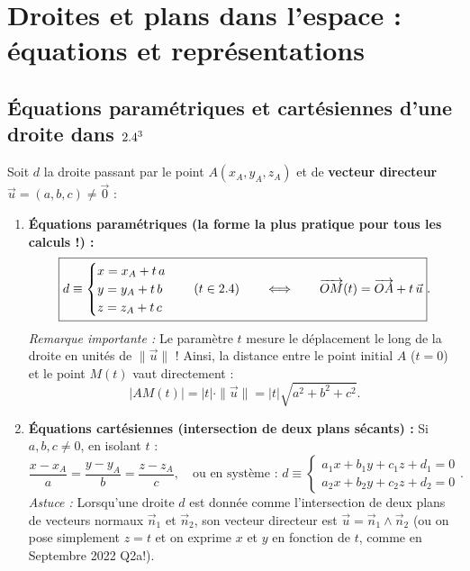 \section{Droites et plans dans l'espace : équations et représentations}

\subsection{Équations paramétriques et cartésiennes d'une droite dans $2.4^3$}

\begin{theoreme}
Soit $d$ la droite passant par le point $A(x_A, y_A, z_A)$ et de \textbf{vecteur directeur} $\vec{u} = (a, b, c) \neq \vec{0}$ :
\begin{enumerate}
    \item \textbf{Équations paramétriques (la forme la plus pratique pour tous les calculs !) :}
    \[
        \boxed{d \equiv \begin{cases} x = x_A + t\,a \\ y = y_A + t\,b \\ z = z_A + t\,c \end{cases} \quad (t \in 2.4) \qquad \Longleftrightarrow \qquad \overrightarrow{OM}(t) = \overrightarrow{OA} + t\,\vec{u}}.
    \]
    \emph{Remarque importante :} Le paramètre $t$ mesure le déplacement le long de la droite en unités de $\|\vec{u}\|$ ! Ainsi, la distance entre le point initial $A$ ($t=0$) et le point $M(t)$ vaut directement :
    \[
        \boxed{|AM(t)| = |t| \cdot \|\vec{u}\| = |t|\sqrt{a^2 + b^2 + c^2}}.
    \]
    \item \textbf{Équations cartésiennes (intersection de deux plans sécants) :} Si $a,b,c \neq 0$, en isolant $t$ :
    \[
        \frac{x - x_A}{a} = \frac{y - y_A}{b} = \frac{z - z_A}{c}, \quad \text{ou en système : } d \equiv \begin{cases} a_1 x + b_1 y + c_1 z + d_1 = 0 \\ a_2 x + b_2 y + c_2 z + d_2 = 0 \end{cases}.
    \]
    \emph{Astuce :} Lorsqu'une droite $d$ est donnée comme l'intersection de deux plans de vecteurs normaux $\vec{n}_1$ et $\vec{n}_2$, son vecteur directeur est $\vec{u} = \vec{n}_1 \wedge \vec{n}_2$ (ou on pose simplement $z = t$ et on exprime $x$ et $y$ en fonction de $t$, comme en Septembre 2022 Q2a!).
\end{enumerate}
\end{theoreme}

